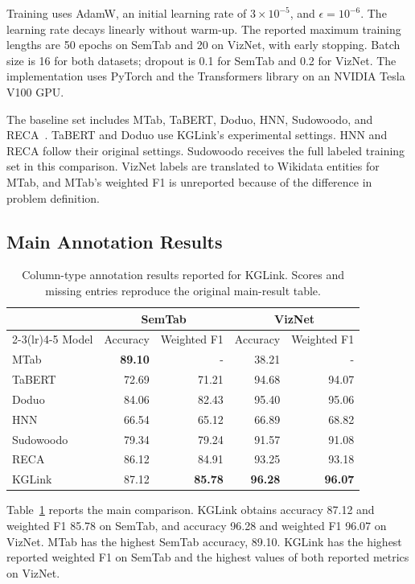 Training uses AdamW, an initial learning rate of $3\times10^{-5}$, and $\epsilon=10^{-6}$. The learning rate decays linearly without warm-up. The reported maximum training lengths are 50 epochs on SemTab and 20 on VizNet, with early stopping. Batch size is 16 for both datasets; dropout is 0.1 for SemTab and 0.2 for VizNet. The implementation uses PyTorch and the Transformers library on an NVIDIA Tesla V100 GPU.

The baseline set includes MTab, TaBERT, Doduo, HNN, Sudowoodo, and RECA~\cite{kglink-2021_mtab4wikidata,kglink-yin2020tabert,kglink-suhara2022annotating,kglink-chen2019learning,kglink-wang2022sudowoodo,kglink-sun2023reca}. TaBERT and Doduo use KGLink's experimental settings. HNN and RECA follow their original settings. Sudowoodo receives the full labeled training set in this comparison. VizNet labels are translated to Wikidata entities for MTab, and MTab's weighted F1 is unreported because of the difference in problem definition.

\subsection{Main Annotation Results}
\label{sec:kglink:main-results}

\begin{table}[tbp]
\centering
\caption{Column-type annotation results reported for KGLink. Scores and missing entries reproduce the original main-result table.}
\label{tab:kglink:main}
\begin{tabular}{lrrrr}
\toprule
&\multicolumn{2}{c}{SemTab}&\multicolumn{2}{c}{VizNet}\\
\cmidrule(lr){2-3}\cmidrule(lr){4-5}
Model&Accuracy&Weighted F1&Accuracy&Weighted F1\\
\midrule
MTab&\textbf{89.10}&-&38.21&-\\
TaBERT&72.69&71.21&94.68&94.07\\
Doduo&84.06&82.43&95.40&95.06\\
HNN&66.54&65.12&66.89&68.82\\
Sudowoodo&79.34&79.24&91.57&91.08\\
RECA&86.12&84.91&93.25&93.18\\
KGLink&87.12&\textbf{85.78}&\textbf{96.28}&\textbf{96.07}\\
\bottomrule
\end{tabular}
\end{table}

Table~\ref{tab:kglink:main} reports the main comparison. KGLink obtains accuracy 87.12 and weighted F1 85.78 on SemTab, and accuracy 96.28 and weighted F1 96.07 on VizNet. MTab has the highest SemTab accuracy, 89.10. KGLink has the highest reported weighted F1 on SemTab and the highest values of both reported metrics on VizNet.

